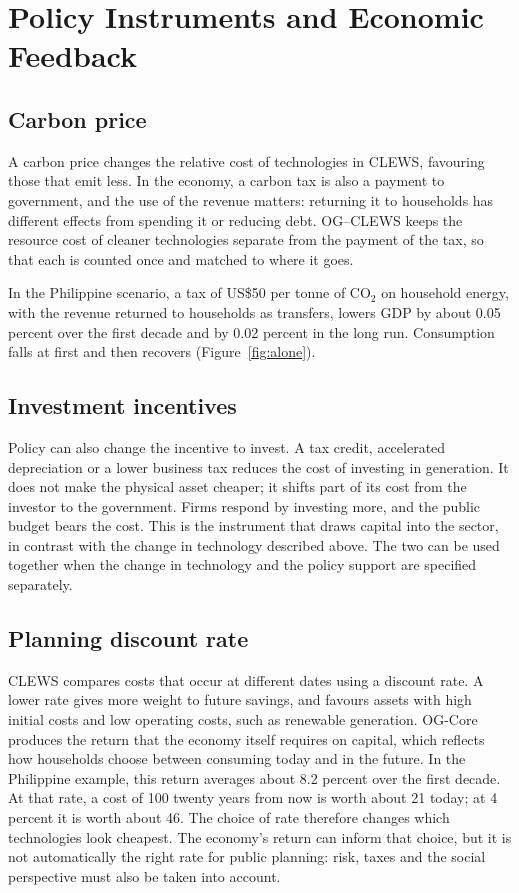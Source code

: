 \section{Policy Instruments and Economic Feedback}
\label{sec:policy-feedback}

\subsection{Carbon price}

A carbon price changes the relative cost of technologies in CLEWS, favouring those that
emit less. In the economy, a carbon tax is also a payment to government, and the use of
the revenue matters: returning it to households has different effects from spending it or
reducing debt. OG--CLEWS keeps the resource cost of cleaner technologies separate from the
payment of the tax, so that each is counted once and matched to where it goes.

In the Philippine scenario, a tax of US\$50 per tonne of CO$_2$ on
household energy, with the revenue returned to households as transfers, lowers GDP by about
0.05 percent over the first decade and by 0.02 percent in the long run. Consumption falls at
first and then recovers (Figure~\ref{fig:alone}).

\subsection{Investment incentives}

Policy can also change the incentive to invest. A tax credit, accelerated depreciation or a
lower business tax reduces the cost of investing in generation. It does not make the physical
asset cheaper; it shifts part of its cost from the investor to the government. Firms respond
by investing more, and the public budget bears the cost. This is the instrument that draws
capital into the sector, in contrast with the change in technology described above. The two
can be used together when the change in technology and the policy support are specified
separately.

\subsection{Planning discount rate}

CLEWS compares costs that occur at different dates using a discount rate. A lower rate gives
more weight to future savings, and favours assets with high initial costs and low operating
costs, such as renewable generation. OG-Core produces the return that the economy itself
requires on capital, which reflects how households choose between consuming today and in
the future. In the Philippine example, this return averages about 8.2 percent over the first
decade. At that rate, a cost of 100 twenty years from now is worth about 21 today; at 4
percent it is worth about 46. The choice of rate therefore changes which technologies look
cheapest. The economy's return can inform that choice, but it is not automatically the right
rate for public planning: risk, taxes and the social perspective must also be taken into
account.

